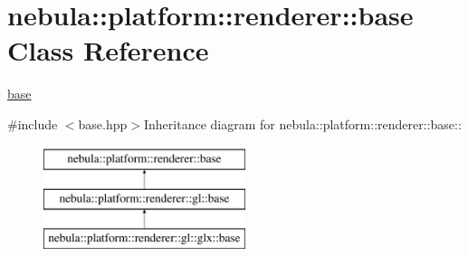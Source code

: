 \hypertarget{classnebula_1_1platform_1_1renderer_1_1base}{
\section{nebula::platform::renderer::base Class Reference}
\label{classnebula_1_1platform_1_1renderer_1_1base}
}


\hyperlink{classnebula_1_1platform_1_1renderer_1_1base}{base}  


{\ttfamily \#include $<$base.hpp$>$}Inheritance diagram for nebula::platform::renderer::base::\begin{figure}[H]
\begin{center}
\leavevmode
\includegraphics[height=3cm]{classnebula_1_1platform_1_1renderer_1_1base}
\end{center}
\end{figure}
